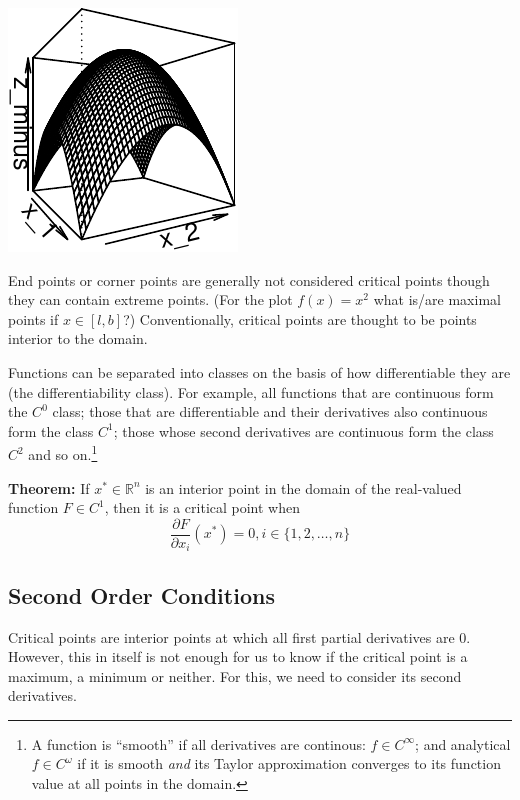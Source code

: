 \documentclass[11pt,]{article}
\let\rmarkdownfootnote\footnote%
\def\footnote{\protect\rmarkdownfootnote}
\begin{document}
\begin{center}\includegraphics{Optimization_files/figure-latex/FOC_dim_2-2} \end{center}

End points or corner points are generally not considered critical points
though they can contain extreme points. (For the plot \(f(x)=x^2\) what
is/are maximal points if \(x\in [l, b]\)?) Conventionally, critical
points are thought to be points interior to the domain.

Functions can be separated into classes on the basis of how
differentiable they are (the differentiability class). For example, all
functions that are continuous form the \(C^0\) class; those that are
differentiable and their derivatives also continuous form the class
\(C^1\); those whose second derivatives are continuous form the class
\(C^2\) and so on.\footnote{A function is ``smooth'' if all derivatives
  are continous: \(f\in C^{\infty}\); and analytical
  \(f \in C^{\omega}\) if it is smooth \emph{and} its Taylor
  approximation converges to its function value at all points in the
  domain.}

\textbf{Theorem:} If \(x^*\in \mathbb{R}^n\) is an interior point in the
domain of the real-valued function \(F\in C^1\), then it is a critical
point when \[
  \frac{\partial F}{\partial x_i}(x^*) = 0, i\in \{1, 2,\hdots, n\}
\]

\subsection{Second Order Conditions}\label{second-order-conditions}

Critical points are interior points at which all first partial
derivatives are 0. However, this in itself is not enough for us to know
if the critical point is a maximum, a minimum or neither. For this, we
need to consider its second derivatives.
\end{document}
